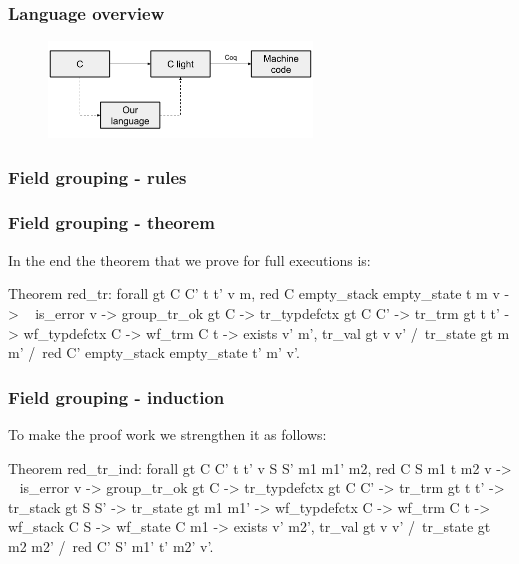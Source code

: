 \begin{frame}[fragile]
\frametitle{Language overview}

\begin{figure}[H]
\centering
\includegraphics[width=7cm]{images/compcert_our_language}
\end{figure}

\end{frame}


\begin{frame}[fragile]
\frametitle{Field grouping - rules}



\end{frame}


\begin{frame}[fragile]
\frametitle{Field grouping - theorem}

In the end the theorem that we prove for full executions is:

\begin{coq}
  Theorem red_tr: forall gt C C' t t' v m,
    red C empty_stack empty_state t m v ->
    ~ is_error v ->
    group_tr_ok gt C ->
    tr_typdefctx gt C C' ->
    tr_trm gt t t' ->
    wf_typdefctx C ->
    wf_trm C t ->
    exists v' m',		tr_val gt v v'
	  	   /\ tr_state gt m m'
		   /\ red C' empty_stack empty_state t' m' v'.
\end{coq}

\end{frame}


\begin{frame}[fragile]
\frametitle{Field grouping - induction}

To make the proof work we strengthen it as follows:

\begin{coq}
  Theorem red_tr_ind: forall gt C C' t t' v S S' m1 m1' m2,
    red C S m1 t m2 v ->
    ~ is_error v ->
    group_tr_ok gt C ->
    tr_typdefctx gt C C' ->
    tr_trm gt t t' ->
    tr_stack gt S S' ->
    tr_state gt m1 m1' ->
    wf_typdefctx C ->
    wf_trm C t ->
    wf_stack C S ->
    wf_state C m1 ->
    exists v' m2',				tr_val gt v v'
			  /\	tr_state gt m2 m2'
			  /\	red C' S' m1' t' m2' v'.
\end{coq}

\end{frame}


